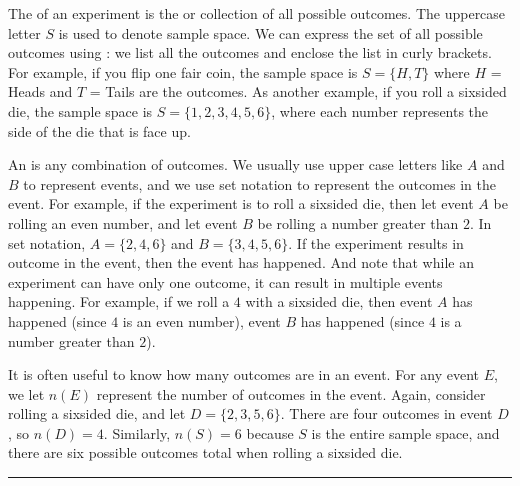 \documentclass[letterpaper,10pt,english]{jupyterBook}
\begin{document}
\sphinxAtStartPar
The  of an experiment is the  or collection of all possible outcomes. The uppercase letter \(S\) is used to denote sample space. We can express the set of all possible outcomes using : we list all the outcomes and enclose the list in curly brackets. For example, if you flip one fair coin, the sample space is \(S = \{H, T\}\) where \(H\) = Heads and \(T\) = Tails are the outcomes. As another example, if you roll a six\sphinxhyphen{}sided die, the sample space is \(S = \{1, 2, 3, 4, 5, 6\}\), where each number represents the side of the die that is face up.

\sphinxAtStartPar
An  is any combination of outcomes. We usually use upper case letters like \(A\) and \(B\) to represent events, and we use set notation to represent the outcomes in the event. For example, if the experiment is to roll a six\sphinxhyphen{}sided die, then let event \(A\) be rolling an even number, and let event \(B\) be rolling a number greater than \(2\). In set notation, \(A = \{2, 4, 6\}\) and \(B = \{3, 4, 5, 6\}\). If the experiment results in  outcome in the event, then the event has happened. And note that while an experiment can have only one outcome, it can result in multiple events happening. For example, if we roll a \(4\) with a six\sphinxhyphen{}sided die, then event \(A\) has happened (since \(4\) is an even number),  event \(B\) has happened (since \(4\) is a number greater than \(2\)).

\sphinxAtStartPar
It is often useful to know how many outcomes are in an event. For any event \(E\), we let \(n(E)\) represent the number of outcomes in the event. Again, consider rolling a six\sphinxhyphen{}sided die, and let \(D = \{2, 3, 5, 6\}\). There are four outcomes in event \(D\), so \(n(D) = 4\). Similarly, \(n(S) = 6\) because \(S\) is the entire sample space, and there are six possible outcomes total when rolling a six\sphinxhyphen{}sided die.


\bigskip\hrule\bigskip
\end{document}

